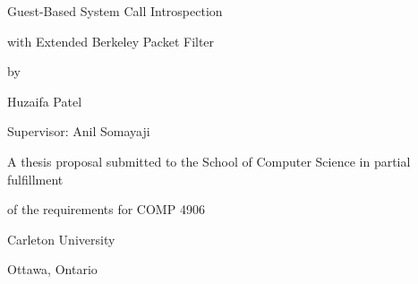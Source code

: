 \documentclass{article}
\begin{document}

\centerline{\Huge Guest-Based System Call Introspection}
\vspace{3mm}
\centerline{\Huge with Extended Berkeley Packet Filter}
\vspace{14mm}
\centerline{\large by}
\vspace{10mm}
\centerline{\large Huzaifa Patel}
\vspace{2mm}
\centerline{\large Supervisor: Anil Somayaji}
\vspace{3cm}
\centerline{\large A thesis proposal submitted to the School of Computer Science in partial fulfillment}
\vspace{2mm}
\centerline{\large of the requirements for COMP 4906}
\vspace{4cm}
\centerline{\large Carleton University}
\vspace{3mm}
\centerline{\large Ottawa, Ontario}




\begin{flushleft}
\vspace{3cm}
\begin{spacing}{1.5}


\end{spacing}
\end{flushleft}
\end{document}

